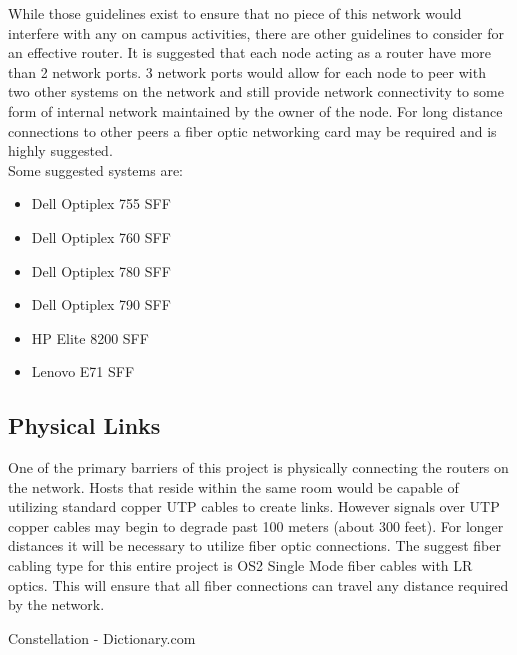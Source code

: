 \documentclass[12pt]{article}
\begin{document}
While those guidelines exist to ensure that no piece of this network would interfere with any on campus activities, there are other guidelines to consider
for an effective router. It is suggested that each node acting as a router have more than 2 network ports. 3 network ports would allow for each node to peer
with two other systems on the network and still provide network connectivity to some form of internal network maintained by the owner of the node. For long
distance connections to other peers a fiber optic networking card may be required and is highly suggested.
\\

Some suggested systems are:

\begin{itemize}
	\item Dell Optiplex 755 SFF
	\item Dell Optiplex 760 SFF
	\item Dell Optiplex 780 SFF
	\item Dell Optiplex 790 SFF
	\item HP Elite 8200 SFF
	\item Lenovo E71 SFF
\end{itemize}

\subsection{Physical Links}

One of the primary barriers of this project is physically connecting the routers on the network. Hosts that reside within the same room would be capable
of utilizing standard copper UTP cables to create links. However signals over UTP copper cables may begin to degrade past 100 meters (about 300 feet). 
For longer distances it will be necessary to utilize fiber optic connections. The suggest fiber cabling type for this entire project is OS2 Single Mode
fiber cables with LR optics. This will ensure that all fiber connections can travel any distance required by the network. 


\begin{thebibliography}{10}
Constellation - Dictionary.com


\end{thebibliography}
\end{document}
